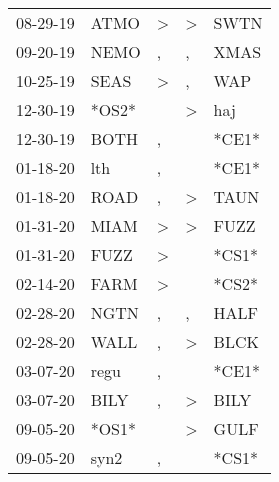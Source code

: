 \begin{supertabular}{p{0.07\textwidth}p{0.06\textwidth}p{0.02\textwidth}p{0.02\textwidth}p{0.06\textwidth}}
          08-29-19\textsuperscript{} &           ATMO\textsuperscript{} &     \textgreater &     \textgreater &           SWTN\textsuperscript{} \\
          09-20-19\textsuperscript{} &           NEMO\textsuperscript{} &                , &                , &           XMAS\textsuperscript{} \\
          10-25-19\textsuperscript{} &           SEAS\textsuperscript{} &     \textgreater &                , &            WAP\textsuperscript{} \\
          12-30-19\textsuperscript{} &                            *OS2* &                  &     \textgreater &            haj\textsuperscript{} \\
          12-30-19\textsuperscript{} &           BOTH\textsuperscript{} &                , &                  &                            *CE1* \\
          01-18-20\textsuperscript{} &            lth\textsuperscript{} &                , &                  &                            *CE1* \\
          01-18-20\textsuperscript{} &           ROAD\textsuperscript{} &                , &     \textgreater &           TAUN\textsuperscript{} \\
          01-31-20\textsuperscript{} &           MIAM\textsuperscript{} &     \textgreater &     \textgreater &           FUZZ\textsuperscript{} \\
          01-31-20\textsuperscript{} &           FUZZ\textsuperscript{} &     \textgreater &                  &                            *CS1* \\
          02-14-20\textsuperscript{} &           FARM\textsuperscript{} &     \textgreater &                  &                            *CS2* \\
          02-28-20\textsuperscript{} &           NGTN\textsuperscript{} &                , &                , &           HALF\textsuperscript{} \\
          02-28-20\textsuperscript{} &           WALL\textsuperscript{} &                , &     \textgreater &           BLCK\textsuperscript{} \\
          03-07-20\textsuperscript{} &           regu\textsuperscript{} &                , &                  &                            *CE1* \\
          03-07-20\textsuperscript{} &           BILY\textsuperscript{} &                , &     \textgreater &           BILY\textsuperscript{} \\
          09-05-20\textsuperscript{} &                            *OS1* &                  &     \textgreater &           GULF\textsuperscript{} \\
          09-05-20\textsuperscript{} &           syn2\textsuperscript{} &                , &                  &                            *CS1* \\
\end{supertabular}
